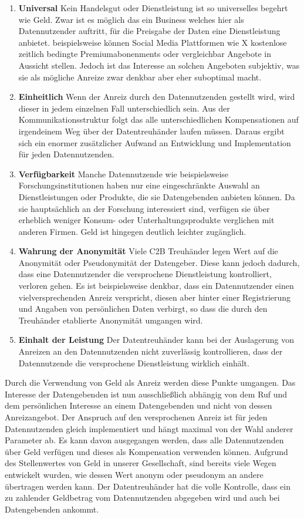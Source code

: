 \documentclass{scrreprt}
\begin{document}
\begin{enumerate}
    \item \textbf{Universal} Kein Handelsgut oder Dienstleistung ist so universelles begehrt wie Geld. Zwar ist es möglich das ein Business welches hier als Datennutzender auftritt, für die Preisgabe der Daten eine Dienstleistung anbietet. beispielsweise können Social Media Plattformen wie X kostenlose zeitlich bedingte Premiumabonenments oder vergleichbar Angebote in Aussicht stellen. Jedoch ist das Interesse an solchen Angeboten subjektiv, was sie als mögliche Anreize zwar denkbar aber eher suboptimal macht.
    \item \textbf{Einheitlich} Wenn der Anreiz durch den Datennutzenden gestellt wird, wird dieser in jedem einzelnen Fall unterschiedlich sein. Aus der Kommunikationsstruktur folgt das alle unterschiedlichen Kompensationen auf irgendeinem Weg über der Datentreuhänder laufen müssen. Daraus ergibt sich ein enormer zusätzlicher Aufwand an Entwicklung und Implementation für jeden Datennutzenden.
    \item \textbf{Verfügbarkeit} Manche Datennutzende wie beispielsweise Forschungsinstitutionen haben nur eine eingeschränkte Auswahl an Dienstleistungen oder Produkte, die sie Datengebenden anbieten können. Da sie hauptsächlich an der Forschung interessiert sind, verfügen sie über erheblich weniger Konsum- oder Unterhaltungsprodukte verglichen mit anderen Firmen. Geld ist hingegen deutlich leichter zugänglich.
    \item \textbf{Wahrung der Anonymität} Viele C2B Treuhänder legen Wert auf die Anonymität oder Pseudonymität der Datengeber. Diese kann jedoch dadurch, dass eine Datennutzender die versprochene Dienstleistung kontrolliert, verloren gehen. Es ist beispielsweise denkbar, dass ein Datennutzender einen vielversprechenden Anreiz verspricht, diesen aber hinter einer Registrierung und Angaben von persönlichen Daten verbirgt, so dass die durch den Treuhänder etablierte Anonymität umgangen wird.
    \item \textbf{Einhalt der Leistung} Der Datentreuhänder kann bei der Auslagerung von Anreizen an den Datennutzenden nicht zuverlässig kontrollieren, dass der Datennutzende die versprochene Dienstleistung wirklich einhält.
\end{enumerate}
Durch die Verwendung von Geld als Anreiz werden diese Punkte umgangen. Das Interesse der Datengebenden ist nun ausschließlich abhängig von dem Ruf und dem persönlichen Interesse an einem Datengebenden und nicht von dessen Anreizangebot. Der Anspruch auf den versprochenen Anreiz ist für jeden Datennutzenden gleich implementiert und hängt maximal von der Wahl anderer Parameter ab. Es kann davon ausgegangen werden, dass alle Datennutzenden über Geld verfügen und dieses als Kompensation verwenden können. Aufgrund des Stellenwertes von Geld in unserer Gesellschaft, sind bereits viele Wegen entwickelt wurden, wie dessen Wert anonym oder pseudonym an andere übertragen werden kann. Der Datentreuhänder hat die volle Kontrolle, dass ein zu zahlender Geldbetrag vom Datennutzenden abgegeben wird und auch bei Datengebenden ankommt.
\end{document}
